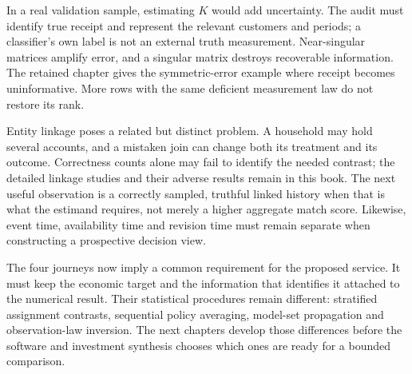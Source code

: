 In a real validation sample, estimating $K$ would add uncertainty. The audit
must identify true receipt and represent the relevant customers and periods;
a classifier's own label is not an external truth measurement. Near-singular
matrices amplify error, and a singular matrix destroys recoverable information.
The retained chapter gives the symmetric-error example where receipt becomes
uninformative. More rows with the same deficient measurement law do not
restore its rank.

Entity linkage poses a related but distinct problem. A household may hold
several accounts, and a mistaken join can change both its treatment and its
outcome. Correctness counts alone may fail to identify the needed contrast;
the detailed linkage studies and their adverse results remain in this book.
The next useful observation is a correctly sampled, truthful linked history
when that is what the estimand requires, not merely a higher aggregate match
score. Likewise, event time, availability time and revision time must remain
separate when constructing a prospective decision view.

The four journeys now imply a common requirement for the proposed service.
It must keep the economic target and the information that identifies it
attached to the numerical result. Their statistical procedures remain
different: stratified assignment contrasts, sequential policy averaging,
model-set propagation and observation-law inversion. The next chapters
develop those differences before the software and investment synthesis chooses
which ones are ready for a bounded comparison.
